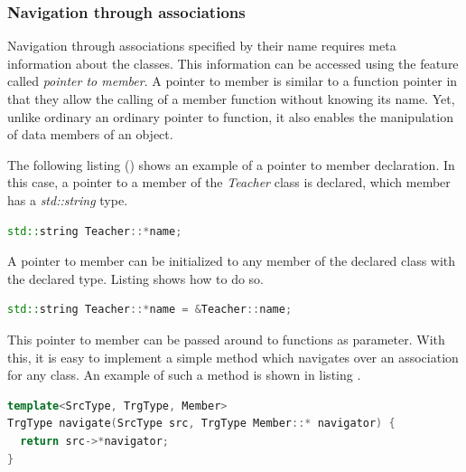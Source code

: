 \subsubsection{Navigation through associations}
\label{sect:NavigationThroughAssociations}

Navigation through associations specified by their name requires meta
information about the classes. This information can be accessed using the \CPP{}
feature called \emph{pointer to member}. A pointer to member is similar to a
function pointer in that they allow the calling of a member function without
knowing its name. Yet, unlike ordinary an ordinary pointer to function, it also
enables the manipulation of data members of an object.

The following listing () shows an example of a pointer to
member declaration. In this case, a pointer to a member of the \emph{Teacher}
class is declared, which member has a \emph{std::string} type.

\begin{lstlisting}[frame=single,float=!ht,language=C++,
label=listing:p2m_decl, caption=Pointer to member declaration]
std::string Teacher::*name;
\end{lstlisting}

A pointer to member can be initialized to any member of the declared class with
the declared type. Listing  shows how to do so.

\begin{lstlisting}[frame=single,float=!ht,language=C++,
label=listing:p2m_init, caption=Pointer to member initialization]
std::string Teacher::*name = &Teacher::name;
\end{lstlisting}

This pointer to member can be passed around to functions as parameter. With
this, it is easy to implement a simple method which navigates over an
association for any class. An example of such a method is shown in listing
.

\begin{lstlisting}[frame=single,float=!ht,language=C++,
label=listing:p2m_usage, caption=An universal navigation method using pointer
to member] 
template<SrcType, TrgType, Member>
TrgType navigate(SrcType src, TrgType Member::* navigator) {
  return src->*navigator;
}
\end{lstlisting}

